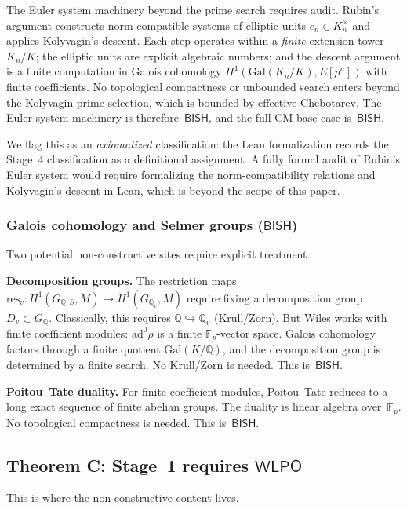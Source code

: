 \documentclass[11pt]{article}
\theoremstyle{plain}
\theoremstyle{definition}
\theoremstyle{remark}
\newcommand{\Q}{\mathbb{Q}}
\newcommand{\F}{\mathbb{F}}
\newcommand{\Qbar}{\overline{\Q}}
\newcommand{\Gal}{\mathrm{Gal}}
\newcommand{\BISH}{\mathsf{BISH}}
\newcommand{\WLPO}{\mathsf{WLPO}}
\begin{document}
The Euler system machinery beyond the prime search requires audit.
Rubin's argument constructs norm-compatible systems of elliptic units
$c_n \in K_n^\times$ and applies Kolyvagin's descent.  Each step
operates within a \emph{finite} extension tower $K_n/K$; the
elliptic units are explicit algebraic numbers; and the descent
argument is a finite computation in Galois cohomology
$H^1(\Gal(K_n/K), E[p^n])$ with finite coefficients.  No
topological compactness or unbounded search enters beyond the
Kolyvagin prime selection, which is bounded by effective Chebotarev.
The Euler system machinery is therefore~$\BISH$, and the full CM
base case is~$\BISH$.

We flag this as an \emph{axiomatized} classification: the Lean
formalization records the Stage~4 classification as a definitional
assignment.  A fully formal audit of Rubin's Euler system would
require formalizing the norm-compatibility relations and
Kolyvagin's descent in Lean, which is beyond the scope of this paper.

\subsubsection{Galois cohomology and Selmer groups (\texorpdfstring{$\BISH$}{BISH})}

Two potential non-constructive sites require explicit treatment.

\textbf{Decomposition groups.}
The restriction maps $\mathrm{res}_v : H^1(G_{\Q,S}, M) \to
H^1(G_{\Q_v}, M)$ require fixing a decomposition group
$D_v \subset G_\Q$.  Classically, this requires
$\Qbar \hookrightarrow \Qbar_v$ (Krull/Zorn).
But Wiles works with finite coefficient modules:
$\mathrm{ad}^0\bar{\rho}$ is a finite $\F_p$-vector space.
Galois cohomology factors through a finite quotient
$\Gal(K/\Q)$, and the decomposition group is determined by a
finite search.  No Krull/Zorn is needed.  This is~$\BISH$.

\textbf{Poitou--Tate duality.}
For finite coefficient modules, Poitou--Tate reduces to a long
exact sequence of finite abelian groups.  The duality is linear
algebra over~$\F_p$.  No topological compactness is needed.
This is~$\BISH$.


\subsection{Theorem C: Stage~1 requires \texorpdfstring{$\WLPO$}{WLPO}}\label{sec:lt}

This is where the non-constructive content lives.
\end{document}

